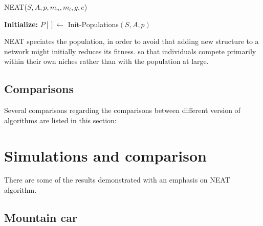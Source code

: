 \documentclass{article}
\begin{document}
\begin{algorithm}[H]
  \label{neat}
  \caption{NEAT($S, A, p , m_n, m_l, g, e$)}
  \textbf{Initialize:} $P[] \leftarrow$ Init-Populations$(S,A,p)$ \;    
  \end{algorithm}


NEAT speciates the population, in order to avoid that adding new structure to a network might initially reduces its fitness.
  so that individuals compete primarily within their own niches rather than with the population at large.






\subsection{Comparisons}
Several comparisons regarding the comparisons between different version of algorithms are listed in this section:









 
\section{Simulations and comparison}
There are some of the results demonstrated with an emphasis on NEAT algorithm.

\subsection{Mountain car}
\end{document}
